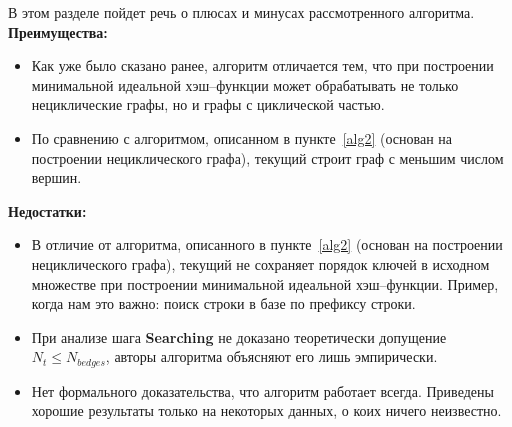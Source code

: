 \documentclass[specialist,
               substylefile = spbu.rtx,
               subf,href,colorlinks=true, 12pt]{disser}
\begin{document}
\newpage

\conclusion

В этом разделе пойдет речь о плюсах и минусах рассмотренного алгоритма.
\\

\textbf{Преимущества:}
\begin{itemize}
\item Как уже было сказано ранее, алгоритм отличается тем, что при построении минимальной идеальной хэш--функции может обрабатывать не только нециклические графы, но и графы с циклической частью.
\item По сравнению с алгоритмом, описанном в пункте~\ref{alg2} (основан на построении нециклического графа), текущий строит граф с меньшим числом вершин.
\end{itemize}

\textbf{Недостатки:}
\begin{itemize}
\item В отличие от алгоритма, описанного в пункте~\ref{alg2} (основан на построении нециклического графа), текущий не сохраняет порядок ключей в исходном множестве при построении минимальной идеальной хэш--функции. Пример, когда нам это важно: поиск строки в базе по префиксу строки.
\item При анализе шага \textbf{Searching} не доказано теоретически допущение $N_{t} \leq N_{bedges}$, авторы алгоритма объясняют его лишь эмпирически.
\item Нет формального доказательства, что алгоритм работает всегда. Приведены хорошие результаты только на некоторых данных, о коих ничего неизвестно.
\end{itemize}
\end{document}
